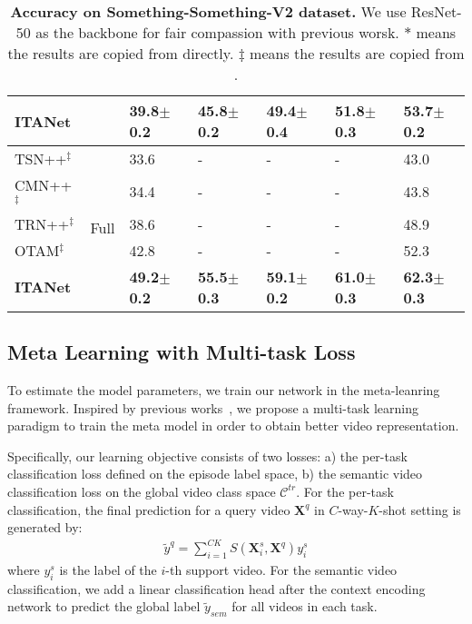 \documentclass{article}
\newcommand{\colorpm}[1]{\footnotesize{\textcolor[RGB]{113,117,250}{#1}}}
\begin{document}
\begin{table*}[thbp]
{\begin{tabular}{l|c|lllll}
			\textbf{ITANet} &    &   \textbf{39.8\colorpm{$\pm$0.2}}  & \textbf{45.8\colorpm{$\pm$0.2}}    & \textbf{49.4\colorpm{$\pm$0.4}} &  \textbf{51.8\colorpm{$\pm$0.3}} &
			   \textbf{53.7\colorpm{$\pm$0.2}} \\
			\midrule
			TSN++$^\ddag$         & \multirow{6}{*}{Full}
										       & 33.6 &   -  &     -   &   - & 43.0 \\
			CMN++$^\ddag$        &    & 34.4 &   -  &     -   &   - & 43.8\\
			TRN++$^\ddag$       &    & 38.6 &   -  &     -   &   - & 48.9\\
			OTAM\cite{cao2020few}$^\ddag$      &
					        &  42.8 &   -  &     -   &   - & 52.3\\
\cmidrule{1-1}\cmidrule{3-7}
			\textbf{ITANet}    &   & \textbf{49.2\colorpm{$\pm$0.2}} & \textbf{55.5\colorpm{$\pm$0.3}} &\textbf{59.1\colorpm{$\pm$0.2}}  & \textbf{61.0\colorpm{$\pm$0.3}}  &  \textbf{62.3\colorpm{$\pm$0.3}}  \\
			\bottomrule
	\end{tabular}} \vspace{-0.8em}
		\caption{\textbf{Accuracy on Something-Something-V2 dataset.} We use ResNet-50 as the backbone for fair compassion with previous worsk. $*$ means the results are copied from \protect\cite{zhu2020label} directly. $\ddag$ means the results are copied from \protect\cite{cao2020few}.}
	\label{tab:quant_sth}
\end{table*}
\subsection{Meta Learning with Multi-task Loss}\label{sec:learning}
To estimate the model parameters, we train our network in the meta-leanring framework. Inspired by previous works~\cite{liu2020part,yan2019dual}, we propose a multi-task learning paradigm to train the meta model in order to obtain better video representation.

Specifically, our learning objective consists of two losses: a) the per-task classification loss defined on the episode label space, b) the semantic video classification loss on the global video class space $\mathcal{C}^{tr}$.
For the per-task classification, the final prediction for a query video $\mathbf{X}^q$ in $C$-way-$K$-shot setting is generated by:
\begin{align}
	\tilde{y}^q=\sum_{i=1}^{CK} S{(\mathbf{X}^s_i,\mathbf{X}^q)} y^s_i
\end{align}
where $y^s_i$ is the label of the $i$-th support video.
For the semantic video classification, we add a linear classification head after the context encoding network to predict the global label $\tilde{y}_{sem}$ for all videos in each task.
 
\end{document}
